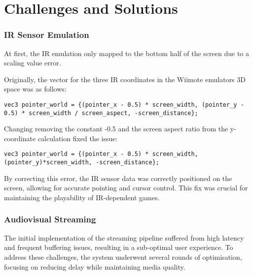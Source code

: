 \section{Challenges and Solutions}


\subsubsection{IR Sensor Emulation}
At first, the IR emulation only mapped to the bottom half of the screen due to a scaling value error.

Originally, the vector for the three IR coordinates in the Wiimote emulators 3D space was as follows:
\begin{lstlisting}[style=CStyle, emph={vec3}, emphstyle={\color{magenta}}]
vec3 pointer_world = {(pointer_x - 0.5) * screen_width, (pointer_y - 0.5) * screen_width / screen_aspect, -screen_distance};
\end{lstlisting}

Changing removing the constant -0.5 and the screen aspect ratio from the y-coordinate calculation fixed the issue:
\begin{lstlisting}[style=CStyle, emph={vec3}, emphstyle={\color{magenta}}]
vec3 pointer_world = {(pointer_x - 0.5) * screen_width, (pointer_y)*screen_width, -screen_distance};
\end{lstlisting}

By correcting this error, the IR sensor data was correctly positioned on the screen, allowing for accurate pointing and cursor control. This fix was crucial for maintaining the playability of IR-dependent games.

\subsubsection{Audiovisual Streaming}
The initial implementation of the streaming pipeline suffered from high latency and frequent buffering issues, resulting in a sub-optimal user experience. To address these challenges, the system underwent several rounds of optimisation, focusing on reducing delay while maintaining media quality.

